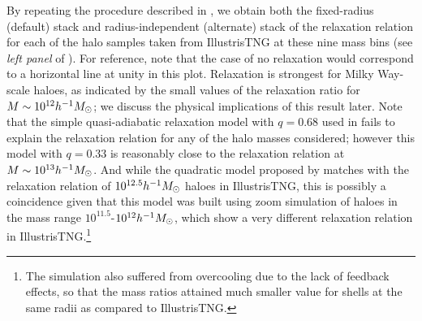 By repeating the procedure described in , we obtain both the fixed-radius (default) stack and radius-independent (alternate) stack of the relaxation relation for each of the halo samples taken from IllustrisTNG at these nine mass bins (see \emph{left panel} of ). 
For reference, note that the case of no relaxation would correspond to a horizontal line at unity in this plot.
Relaxation is strongest for Milky Way-scale haloes, as indicated by the small values of the relaxation ratio for $M\sim10^{12}h^{-1}M_{\odot}$; we discuss the physical implications of this result later. 
Note that the simple quasi-adiabatic relaxation model  with $q=0.68$ used in \cite{2015JCAP...12..049S} fails to explain the relaxation relation for any of the halo masses considered; however this model with $q=0.33$ is reasonably close to the relaxation relation at %
$M\sim 10^{13} h^{-1}M_{\odot}$. 
And while the quadratic model proposed by \cite{2010MNRAS.407..435A} matches with the relaxation relation of $10^{12.5} h^{-1}M_{\odot}$ haloes in IllustrisTNG, this is possibly a coincidence given that this model was built using zoom simulation of haloes in the mass range $10^{11.5} $-$ 10^{12} h^{-1}M_{\odot}$, which show a very different relaxation relation in IllustrisTNG.\footnote{The \cite{2010MNRAS.407..435A} simulation also suffered from overcooling due to the lack of feedback effects, so that the mass ratios attained much smaller value for shells at the same radii as compared to IllustrisTNG.}

